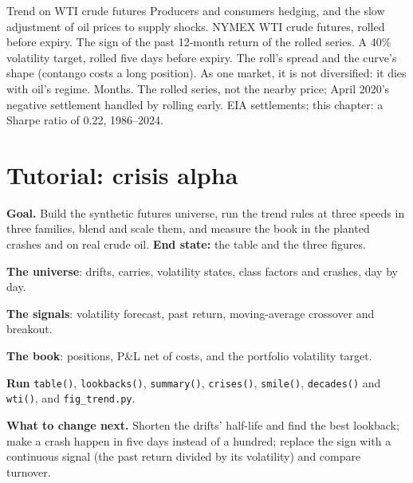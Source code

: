 \begin{strategyfile}{Trend on WTI crude futures}\label{strat:s1:trend-following:wti}
 Producers and consumers hedging, and the slow adjustment of oil prices to supply shocks.
 NYMEX WTI crude futures, rolled before expiry.
 The sign of the past 12-month return of the rolled series.
 A 40\% volatility target, rolled five days before expiry.
 The roll's spread and the curve's shape (contango costs a long position).
 As one market, it is not diversified: it dies with oil's regime.
 Months.
 The rolled series, not the nearby price; April 2020's negative settlement handled by rolling early.
 EIA settlements; this chapter: a Sharpe ratio of 0.22, 1986--2024.
\end{strategyfile}

\section{Tutorial: crisis alpha}\label{tut:s1:trend-following:tut}

\begin{tutorial}
\textbf{Goal.} Build the synthetic futures universe, run the trend rules at three speeds in three families, blend and scale them, and measure the book in
the planted crashes and on real crude oil. \textbf{End state:} the table and the three figures.
\begin{tutsteps}
\item \textbf{The universe}: drifts, carries, volatility states, class factors and crashes, day by day.
\label{lst:s1:trend-following:synthfut}
\item \textbf{The signals}: volatility forecast, past return, moving-average crossover and breakout.
\label{lst:s1:trend-following:signals}
\item \textbf{The book}: positions, P\&L net of costs, and the portfolio volatility target.
\label{lst:s1:trend-following:book}
\item \textbf{Run} \texttt{table()}, \texttt{lookbacks()}, \texttt{summary()}, \texttt{crises()}, \texttt{smile()}, \texttt{decades()} and
\texttt{wti()}, and \texttt{fig\_trend.py}.
\end{tutsteps}
\textbf{What to change next.} Shorten the drifts' half-life and find the best lookback; make a crash happen in five days instead of a hundred; replace
the sign with a continuous signal (the past return divided by its volatility) and compare turnover.
\end{tutorial}

